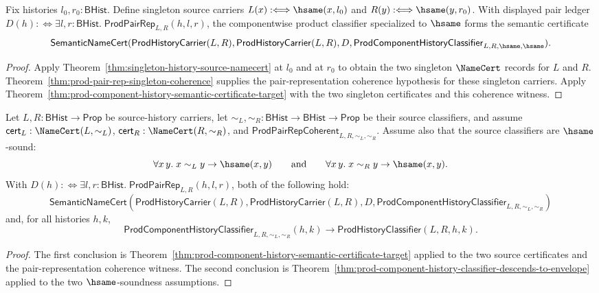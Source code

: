 \begin{theorem}
\label{thm:prod-singleton-componentwise-semantic-certificate}
Fix histories $l_0,r_0:\mathsf{BHist}$. Define singleton source carriers
$L(x):\Longleftrightarrow\hsame(x,l_0)$ and
$R(y):\Longleftrightarrow\hsame(y,r_0)$. With displayed pair ledger
$D(h):\Longleftrightarrow
\exists l,r:\mathsf{BHist}.\;\mathsf{ProdPairRep}_{L,R}(h,l,r)$, the
componentwise product classifier specialized to $\hsame$ forms the semantic
certificate
$$
\mathsf{SemanticNameCert}(\mathsf{ProdHistoryCarrier}(L,R),
\mathsf{ProdHistoryCarrier}(L,R),
D,
\mathsf{ProdComponentHistoryClassifier}_{L,R,\hsame,\hsame}).
$$
\end{theorem}
\begin{proof}
Apply Theorem~\ref{thm:singleton-history-source-namecert} at $l_0$ and at
$r_0$ to obtain the two singleton $\NameCert$ records for $L$ and $R$.
Theorem~\ref{thm:prod-pair-rep-singleton-coherence} supplies the
pair-representation coherence hypothesis for these singleton carriers. Apply
Theorem~\ref{thm:prod-component-history-semantic-certificate-target} with the
two singleton certificates and this coherence witness.
\end{proof}

\begin{theorem}
\label{thm:prod-componentwise-certificate-refines-checked-envelope}
Let $L,R:\mathsf{BHist}\to\mathsf{Prop}$ be source-history carriers, let
$\sim_L,\sim_R:\mathsf{BHist}\to\mathsf{BHist}\to\mathsf{Prop}$ be their source
classifiers, and assume $\mathsf{cert}_L:\NameCert(L,\sim_L)$,
$\mathsf{cert}_R:\NameCert(R,\sim_R)$, and
$\mathsf{ProdPairRepCoherent}_{L,R,\sim_L,\sim_R}$. Assume also that the source
classifiers are $\hsame$-sound:
$$
\forall x\,y.\;x\sim_L y\to\hsame(x,y)
\qquad\hbox{and}\qquad
\forall x\,y.\;x\sim_R y\to\hsame(x,y).
$$
With $D(h):\Longleftrightarrow
\exists l,r:\mathsf{BHist}.\;\mathsf{ProdPairRep}_{L,R}(h,l,r)$, both of the
following hold:
$$
\mathsf{SemanticNameCert}(\mathsf{ProdHistoryCarrier}(L,R),
\mathsf{ProdHistoryCarrier}(L,R),
D,
\mathsf{ProdComponentHistoryClassifier}_{L,R,\sim_L,\sim_R})
$$
and, for all histories $h,k$,
$$
\mathsf{ProdComponentHistoryClassifier}_{L,R,\sim_L,\sim_R}(h,k)
\to
\mathsf{ProdHistoryClassifier}(L,R,h,k).
$$
\end{theorem}
\begin{proof}
The first conclusion is Theorem~\ref{thm:prod-component-history-semantic-certificate-target}
applied to the two source certificates and the pair-representation coherence
witness. The second conclusion is
Theorem~\ref{thm:prod-component-history-classifier-descends-to-envelope}
applied to the two $\hsame$-soundness assumptions.
\end{proof}


